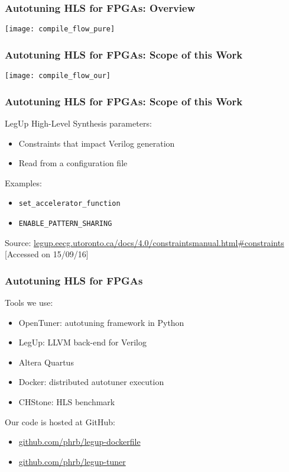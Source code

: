 \documentclass[10pt, compress, aspectratio=169]{beamer}
\begin{document}
\begin{frame}
    \frametitle{Autotuning HLS for FPGAs: Overview}
    \begin{center}
        \texttt{[image: compile\_flow\_pure]}
    \end{center}
\end{frame}

\begin{frame}
    \frametitle{Autotuning HLS for FPGAs: Scope of this Work}
    \begin{center}
        \texttt{[image: compile\_flow\_our]}
    \end{center}
\end{frame}

\begin{frame}
    \frametitle{Autotuning HLS for FPGAs: Scope of this Work}
    LegUp High-Level Synthesis parameters:
    \begin{itemize}
        \item Constraints that \alert{impact Verilog generation}
        \item Read from a \alert{configuration file}
    \end{itemize}

    Examples:
    \begin{itemize}
        \item \texttt{set\_accelerator\_function}
        \item \texttt{ENABLE\_PATTERN\_SHARING}
    \end{itemize}

    \begin{center}
        \tiny{Source: \url{legup.eecg.utoronto.ca/docs/4.0/constraintsmanual.html\#constraints} [Accessed on 15/09/16]}
    \end{center}
\end{frame}

\begin{frame}
    \frametitle{Autotuning HLS for FPGAs}
    Tools we use:
    \begin{itemize}
        \item OpenTuner: \alert{autotuning framework} in Python
        \item LegUp: LLVM \alert{back-end for Verilog}
        \item Altera Quartus
        \item Docker: \alert{distributed} autotuner execution
        \item CHStone: \alert{HLS benchmark}
    \end{itemize}

    Our code is hosted at GitHub:

    \begin{itemize}
        \item \url{github.com/phrb/legup-dockerfile}
        \item \url{github.com/phrb/legup-tuner}
    \end{itemize}
\end{frame}
\end{document}
